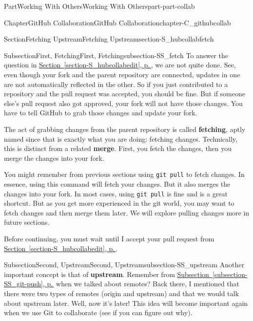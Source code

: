 \documentclass[twoside,10pt,]{book}
\newcommand{\xreffont}{\relax}
\newcommand{\mono}[1]{\texttt{#1}}
\newcommand{\terminology}[1]{\textbf{#1}}
\begin{document}
\begin{partptx}{Part}{Working With Others}{}{Working With Others}{}{}{part-part-collab}
\begin{chapterptx}{Chapter}{GitHub Collaboration}{}{GitHub Collaboration}{}{}{chapter-C_githubcollab}
\begin{sectionptx}{Section}{Fetching Upstream}{}{Fetching Upstream}{}{}{section-S_hubcollabfetch}
%
%
\typeout{************************************************}
\typeout{************************************************}
%
\begin{subsectionptx}{Subsection}{First, Fetching}{}{First, Fetching}{}{}{subsection-SS_fetch}
%
%
To answer the question in \hyperref[section-S_hubcollabedit]{Section~{\xreffont\ref{section-S_hubcollabedit}}, p.\,\pageref{section-S_hubcollabedit}}, we are not quite done. See, even though your fork and the parent repository are connected, updates in one are not automatically reflected in the other. So if you just contributed to a repository and the pull request was accepted, you should be fine. But if someone else's pull request also got approved, your fork will not have those changes. You have to tell GitHub to grab those changes and update your fork.%
\par
The act of grabbing changes from the parent repository is called \terminology{fetching}, aptly named since that is exactly what you are doing: fetching changes. Technically, this is distinct from a related \terminology{merge}. First, you fetch the changes, then you merge the changes into your fork.%
\par
You might remember from previous sections using \mono{git pull} to fetch changes. In essence, using this command will fetch your changes. But it also merges the changes into your fork. In most cases, using \mono{git pull} is fine and is a great shortcut. But as you get more experienced in the git world, you may want to fetch changes and then merge them later. We will explore pulling changes more in future sections.%
\par
Before continuing, you must wait until I accept your pull request from \hyperref[section-S_hubcollabedit]{Section~{\xreffont\ref{section-S_hubcollabedit}}, p.\,\pageref{section-S_hubcollabedit}}.%
\end{subsectionptx}
%
%
\typeout{************************************************}
\typeout{************************************************}
%
\begin{subsectionptx}{Subsection}{Second, Upstream}{}{Second, Upstream}{}{}{subsection-SS_upstream}
%
%
Another important concept is that of \terminology{upstream}. Remember from \hyperref[subsection-SS_git-push]{Subsection~{\xreffont\ref{subsection-SS_git-push}}, p.\,\pageref{subsection-SS_git-push}} when we talked about remotes? Back there, I mentioned that there were two types of remotes (origin and upstream) and that we would talk about upstream later. Well, now it's later! This idea will become important again when we use Git to collaborate (see if you can figure out why).%

\end{subsectionptx}
\end{sectionptx}
\end{chapterptx}
\end{partptx}
\end{document}
